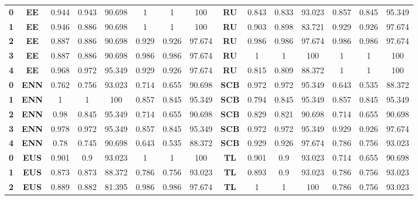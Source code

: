 {{\begin{tabular}{c|c|cccccc|ccccccc}
\textbf{0} & \textbf{EE} & 0.944 & 0.943 & 90.698 & 1     & 1     & 100   & \multicolumn{1}{c|}{\textbf{RU}} & 0.843 & 0.833 & 93.023 & 0.857 & 0.845 & 95.349 \\
\textbf{1} & \textbf{EE} & 0.946 & 0.886 & 90.698 & 1     & 1     & 100   & \multicolumn{1}{c|}{\textbf{RU}} & 0.903 & 0.898 & 83.721 & 0.929 & 0.926 & 97.674 \\
\textbf{2} & \textbf{EE} & 0.887 & 0.886 & 90.698 & 0.929 & 0.926 & 97.674 & \multicolumn{1}{c|}{\textbf{RU}} & 0.986 & 0.986 & 97.674 & 0.986 & 0.986 & 97.674 \\
\textbf{3} & \textbf{EE} & 0.887 & 0.886 & 90.698 & 0.986 & 0.986 & 97.674 & \multicolumn{1}{c|}{\textbf{RU}} & 1     & 1     & 100   & 1     & 1     & 100 \\
\textbf{4} & \textbf{EE} & 0.968 & 0.972 & 95.349 & 0.929 & 0.926 & 97.674 & \multicolumn{1}{c|}{\textbf{RU}} & 0.815 & 0.809 & 88.372 & 1     & 1     & 100 \\
\textbf{0} & \textbf{ENN} & 0.762 & 0.756 & 93.023 & 0.714 & 0.655 & 90.698 & \multicolumn{1}{c|}{\textbf{SCB}} & 0.972 & 0.972 & 95.349 & 0.643 & 0.535 & 88.372 \\
\textbf{1} & \textbf{ENN} & 1     & 1     & 100   & 0.857 & 0.845 & 95.349 & \multicolumn{1}{c|}{\textbf{SCB}} & 0.794 & 0.845 & 95.349 & 0.857 & 0.845 & 95.349 \\
\textbf{2} & \textbf{ENN} & 0.98  & 0.845 & 95.349 & 0.714 & 0.655 & 90.698 & \multicolumn{1}{c|}{\textbf{SCB}} & 0.829 & 0.821 & 90.698 & 0.714 & 0.655 & 90.698 \\
\textbf{3} & \textbf{ENN} & 0.978 & 0.972 & 95.349 & 0.857 & 0.845 & 95.349 & \multicolumn{1}{c|}{\textbf{SCB}} & 0.972 & 0.972 & 95.349 & 0.929 & 0.926 & 97.674 \\
\textbf{4} & \textbf{ENN} & 0.78  & 0.745 & 90.698 & 0.643 & 0.535 & 88.372 & \multicolumn{1}{c|}{\textbf{SCB}} & 0.929 & 0.926 & 97.674 & 0.786 & 0.756 & 93.023 \\
\textbf{0} & \textbf{EUS} & 0.901 & 0.9   & 93.023 & 1     & 1     & 100   & \multicolumn{1}{c|}{\textbf{TL}} & 0.901 & 0.9   & 93.023 & 0.714 & 0.655 & 90.698 \\
\textbf{1} & \textbf{EUS} & 0.873 & 0.873 & 88.372 & 0.786 & 0.756 & 93.023 & \multicolumn{1}{c|}{\textbf{TL}} & 0.893 & 0.9   & 93.023 & 0.786 & 0.756 & 93.023 \\
\textbf{2} & \textbf{EUS} & 0.889 & 0.882 & 81.395 & 0.986 & 0.986 & 97.674 & \multicolumn{1}{c|}{\textbf{TL}} & 1     & 1     & 100   & 0.786 & 0.756 & 93.023 \\

\end{tabular}}}
